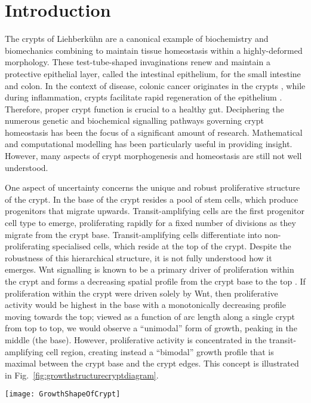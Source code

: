 \section{Introduction}
The crypts of Liehberk\"{u}hn are a canonical example of biochemistry and biomechanics combining to maintain tissue homeostasis within a highly-deformed morphology. These test-tube-shaped invaginations renew and maintain a protective epithelial layer, called the intestinal epithelium, for the small intestine and colon. In the context of disease, colonic cancer originates in the crypts \cite{Humphries2008}, while during inflammation, crypts facilitate rapid regeneration of the epithelium \cite{seno2009efficient}. Therefore, proper crypt function is crucial to a healthy gut. Deciphering the numerous genetic and biochemical signalling pathways governing crypt homeostasis has been the focus of a significant amount of research. Mathematical and computational modelling has been particularly useful in providing insight. However, many aspects of crypt morphogenesis and homeostasis are still not well understood. 

One aspect of uncertainty concerns the unique and robust proliferative structure of the crypt. In the base of the crypt resides a pool of stem cells, which produce progenitors that migrate upwards. Transit-amplifying cells are the first progenitor cell type to emerge, proliferating rapidly for a fixed number of divisions as they migrate from the crypt base. Transit-amplifying cells differentiate into non-proliferating specialised cells, which reside at the top of the crypt. Despite the robustness of this hierarchical structure, it is not fully understood how it emerges. Wnt signalling is known to be a primary driver of proliferation within the crypt \cite{clevers2006wnt} and forms a decreasing spatial profile from the crypt base to the top \cite{gaspar2004apc}. If proliferation within the crypt were driven solely by Wnt, then proliferative activity would be highest in the base with a monotonically decreasing profile moving towards the top; viewed as a function of arc length along a single crypt from top to top, we would observe a ``unimodal'' form of growth, peaking in the middle (the base). However, proliferative activity is concentrated in the transit-amplifying cell region, creating instead a ``bimodal'' growth profile that is maximal between the crypt base and the crypt edges. This concept is illustrated in Fig.\ \ref{fig:growthstructurecryptdiagram}. 

\begin{figure*}[t!]
	\centering
	\texttt{[image: GrowthShapeOfCrypt]}
	\vspace{-1cm}
	\caption{\textbf{The internal proliferative structure of the crypt.} The proliferative structure is bimodal as a function of position along the crypt, i.e. maximal between the crypt base and crypt top. However, Wnt signalling, thought to be the primary governor of proliferation, is unimodal, i.e. maximal at the base.}
	\label{fig:growthstructurecryptdiagram}
\end{figure*}

